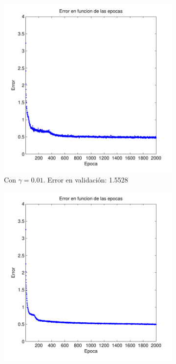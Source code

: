 \documentclass[informe.tex]{subfiles}
\begin{document}
\begin{figure}[H]
        \begin{subfigure}[b]{0.49\textwidth}
                \includegraphics[width=\textwidth]{graficos/error_fold2_20_binary-regresion_2000_001.pdf}
                \caption{Con $\gamma=0.01$. Error en validación: 1.5528}
                \label{fig:d2-f2-2k-001-n20}
        \end{subfigure}
        \begin{subfigure}[b]{0.49\textwidth}
                \includegraphics[width=\textwidth]{graficos/error_fold2_20_binary-regresion_2000_0005.pdf}

\end{subfigure}
\end{figure}
\end{document}
